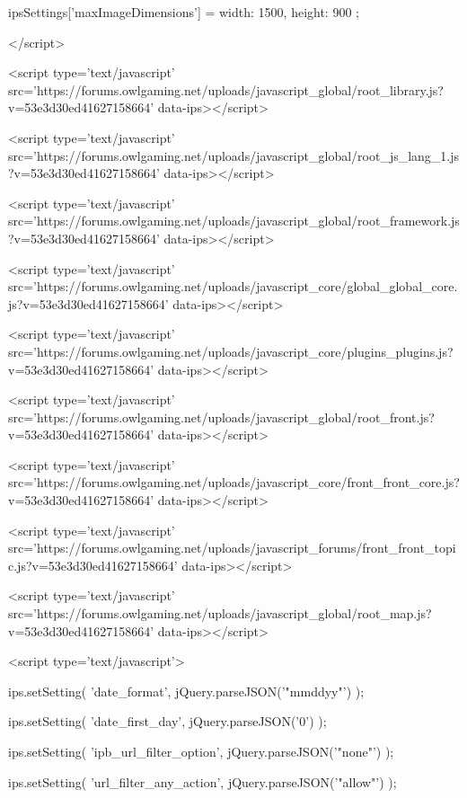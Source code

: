 		
		
		
			ipsSettings['maxImageDimensions'] = {
				width: 1500,
				height: 900
			};
		
		
	</script>





<script type='text/javascript' src='https://forums.owlgaming.net/uploads/javascript_global/root_library.js?v=53e3d30ed41627158664' data-ips></script>


<script type='text/javascript' src='https://forums.owlgaming.net/uploads/javascript_global/root_js_lang_1.js?v=53e3d30ed41627158664' data-ips></script>


<script type='text/javascript' src='https://forums.owlgaming.net/uploads/javascript_global/root_framework.js?v=53e3d30ed41627158664' data-ips></script>


<script type='text/javascript' src='https://forums.owlgaming.net/uploads/javascript_core/global_global_core.js?v=53e3d30ed41627158664' data-ips></script>


<script type='text/javascript' src='https://forums.owlgaming.net/uploads/javascript_core/plugins_plugins.js?v=53e3d30ed41627158664' data-ips></script>


<script type='text/javascript' src='https://forums.owlgaming.net/uploads/javascript_global/root_front.js?v=53e3d30ed41627158664' data-ips></script>


<script type='text/javascript' src='https://forums.owlgaming.net/uploads/javascript_core/front_front_core.js?v=53e3d30ed41627158664' data-ips></script>


<script type='text/javascript' src='https://forums.owlgaming.net/uploads/javascript_forums/front_front_topic.js?v=53e3d30ed41627158664' data-ips></script>


<script type='text/javascript' src='https://forums.owlgaming.net/uploads/javascript_global/root_map.js?v=53e3d30ed41627158664' data-ips></script>



	<script type='text/javascript'>
		
			ips.setSetting( 'date_format', jQuery.parseJSON('"mm\/dd\/yy"') );
		
			ips.setSetting( 'date_first_day', jQuery.parseJSON('0') );
		
			ips.setSetting( 'ipb_url_filter_option', jQuery.parseJSON('"none"') );
		
			ips.setSetting( 'url_filter_any_action', jQuery.parseJSON('"allow"') );
		
